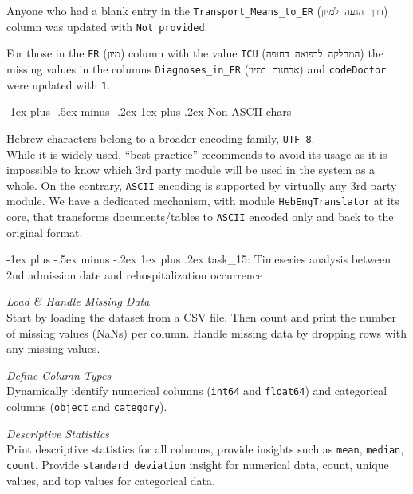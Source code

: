 \documentclass[a4paper,landscape]{article}
\makeatletter
\renewcommand{\subsubsection}{\@startsection{subsubsection}{3}{0mm}%
                                {-1ex plus -.5ex minus -.2ex}%
                                {1ex plus .2ex}%
                                {\normalfont\small\bfseries}}
\makeatother
\begin{document}
Anyone who had a blank entry in the \texttt{Transport\_Means\_to\_ER}
(\texttt{דרך\ הגעה\ למיון}) column was updated with
\texttt{\textquotesingle{}Not\ provided\textquotesingle{}}.

For those in the \texttt{ER} (\texttt{מיון}) column with the value
\texttt{ICU} (\texttt{המחלקה\ לרפואה\ דחופה}) the missing values in the
columns \texttt{Diagnoses\_in\_ER} (\texttt{אבחנות\ במיון}) and
\texttt{codeDoctor} were updated with \texttt{1}.

\subsubsection{Non-ASCII chars}\label{non-ascii-chars}

Hebrew characters belong to a broader encoding family, \texttt{UTF-8}.\\
While it is widely used, ``best-practice'' recommends to avoid its usage
as it is impossible to know which 3rd party module will be used in the
system as a whole. On the contrary, \texttt{ASCII} encoding is supported
by virtually any 3rd party module. We have a dedicated mechanism, with
module \texttt{HebEngTranslator} at its core, that transforms
documents/tables to \texttt{ASCII} encoded only and back to the original
format.

\subsubsection{task\_15: Timeseries analysis between 2nd admission date
and rehospitalization
occurrence}\label{task_15-timeseries-analysis-between-2nd-admission-date-and-rehospitalization-occurrence}

\emph{Load \& Handle Missing Data}\\
Start by loading the dataset from a CSV file. Then count and print the
number of missing values (NaNs) per column. Handle missing data by
dropping rows with any missing values.

\emph{Define Column Types}\\
Dynamically identify numerical columns (\texttt{int64} and
\texttt{float64}) and categorical columns (\texttt{object} and
\texttt{category}).

\emph{Descriptive Statistics}\\
Print descriptive statistics for all columns, provide insights such as
\texttt{mean}, \texttt{median}, \texttt{count}. Provide
\texttt{standard\ deviation} insight for numerical data, count, unique
values, and top values for categorical data.
\end{document}
